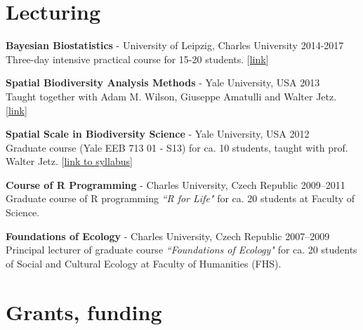 \HRule

\section{Lecturing}

\begin{innerlist}


\item[]{\bf Bayesian Biostatistics} - University of Leipzig, Charles University
\hfill {2014-2017}\\
Three-day intensive practical course for 15-20 students.
[\href{http://www.petrkeil.com/?p=1881}{link}]

\medskip

\item[]{\bf Spatial Biodiversity Analysis Methods} - Yale University, USA
\hfill {2013}\\
Taught together with Adam M. Wilson, Giuseppe Amatulli and Walter Jetz.
[\href{https://sites.google.com/site/spatialbiodiversity/home}{link}]

\medskip

\item[]{\bf Spatial Scale in Biodiversity Science} - Yale University, USA
\hfill {2012} \\
Graduate course (Yale EEB 713 01 - S13) for ca. 10 students, taught with prof. Walter Jetz. [\href{http://pantheon.yale.edu/~pk327/pdf/Keil&Jetz_syllabus.pdf}{link to syllabus}]

\medskip

\item[]{\bf Course of R Programming} - Charles University, Czech Republic
\hfill {2009--2011} \\
Graduate course of R programming \textit{``R for Life"} for ca. 20 students at Faculty of Science.

\medskip

\item[]{\bf Foundations of Ecology} - Charles University, Czech Republic
\hfill {2007--2009} \\
Principal lecturer of graduate course \textit{``Foundations of Ecology"} for ca. 20 students of Social and Cultural Ecology at Faculty of Humanities (FHS).

\end{innerlist}

\HRule


\section{Grants, funding}

